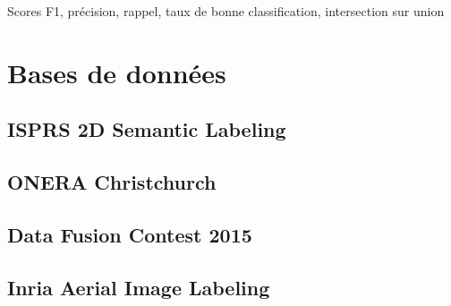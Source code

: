 Scores F1, précision, rappel, taux de bonne classification, intersection sur union

\section{Bases de données}

\subsection{ISPRS 2D Semantic Labeling}

\subsection{ONERA Christchurch}

\subsection{Data Fusion Contest 2015}

\subsection{Inria Aerial Image Labeling}
	


